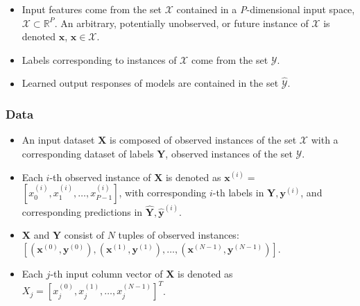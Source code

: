 \documentclass[information,article,submit,moreauthors,pdftex]{definitions/mdpi}
\begin{document}
\begin{itemize}[leftmargin=*,labelsep=5.8mm]
	\item Input features come from the set $\mathcal{X}$ contained in a \textit{P}-dimensional input space, $\mathcal{X} \subset \mathbb{R}^P$.  An arbitrary, potentially unobserved, or future instance of $\mathcal{X}$ is denoted $\mathbf{x}$, $\mathbf{x} \in \mathcal{X}$.
	\item Labels corresponding to instances of $\mathcal{X}$ come from the set $\mathcal{Y}$.
	\item Learned output responses of models are contained in the set $\mathcal{\hat{Y}}$. %
\end{itemize}	

\subsubsection{Data} 

\begin{itemize}[leftmargin=*,labelsep=5.8mm]
	\item An input dataset $\mathbf{X}$ is composed of observed instances of the set $\mathcal{X}$ with a corresponding dataset of labels $\mathbf{Y}$, observed instances of the set $\mathcal{Y}$. 
	\item Each $i$-th observed instance of $\mathbf{X}$ is denoted as $\mathbf{x}^{(i)} = $  
	$[x_0^{(i)}, x_1^{(i)}, \dots, x_{\textit{P}-1}^{(i)}]$, with corresponding $i$-th labels in $\mathbf{Y}, \mathbf{y}^{(i)}$, and corresponding predictions in $\mathbf{\hat{Y}}, \mathbf{\hat{y}}^{(i)}$. %
	\item $\mathbf{X}$ and $\mathbf{Y}$ consist of $N$ tuples of observed instances: $[(\mathbf{x}^{(0)},\mathbf{y}^{(0)}), (\mathbf{x}^{(1)},\mathbf{y}^{(1)}), \dots,(\mathbf{x}^{(N-1)},\mathbf{y}^{(N-1)})]$. %
	\item Each $j$-th input column vector of $\mathbf{X}$ is denoted as $X_j = [x_{j}^{(0)}, x_{j}^{(1)}, \dots, x_{j}^{(N-1)}]^T$.
\end{itemize}	 
\end{document}
